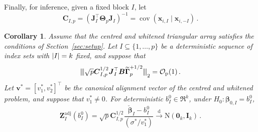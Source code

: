 \documentclass{article}
\makeatletter
\DeclareMathOperator{\cov}{cov}
\newtheorem{corollary}[theorem]{Corollary}
\theoremstyle{definition}
\newcommand{\abs}[1]{%
	\ensuremath{%
		\if@display
		\left| #1 \right|
		\else
		\lvert #1 \rvert
		\fi
	}%
}
\newcommand{\mnorms}[1]{{\vert\kern-0.25ex\vert\kern-0.25ex\vert #1
		\vert\kern-0.25ex\vert\kern-0.25ex\vert}}
\newcommand*{\bb}{\boldsymbol}
\def\bx{\bb{x}}
\def\bv{\bb{v}}
\def\bTheta{\bb{\Theta}}
\def\bbeta{\bb{\beta}}
\makeatother
\begin{document}
\begin{bibunit}
Finally, for inference, given a fixed block $I$, let
$$
\bb C_{I,p}
=
\left(
\bb J_I^\top\bTheta_p\bb J_I
\right)^{-1}
=
\cov(\bx_{i,I}\mid\bx_{i,-I})\,.
$$
\begin{corollary}

\label{cor:gaussian-covariance-adjusted-z}
Assume that the centred and whitened triangular array satisfies the
conditions of Section~\ref{sec:setup}. Let
$I\subseteq\{1,\ldots,p\}$ be a deterministic sequence of index sets
with $\abs{I}=k$ fixed, and suppose that
\begin{equation}
\label{eq:covariance-adjusted-z-leverage}
    \mnorms{
        \sqrt p
        \bb C_{I,p}^{1/2}
        \bb J_I^\top
        \bb B
        \widetilde{\bb\Gamma}_p^{+1/2}
    }_2
    =
    \mathcal O_{\mathrm p}(1) \,.
\end{equation}
Let
$\bv^*=[v_1^*,v_2^*]^\top$
be the canonical alignment vector of the centred and whitened problem, and
suppose that $v_1^*\neq0$. For deterministic
$b_I^0\in\Re^k$, under
$
    H_0:
    \bbeta_{0,I}=b_I^0
$,
\begin{equation}
\label{eq:covariance-adjusted-z-limit}
    \bb Z_I^{\mathrm{adj}}(b_I^0)
    =
    \sqrt p  \bb C_{I,p}^{1/2} \frac{\check{\bbeta}_I-b_I^0}{(\sigma^* / v_1^*)}
    \overset{\mathrm d}{\longrightarrow}
    \mathrm N(\bb0_k,\bb I_k)\,.
\end{equation}


\end{corollary}
\end{bibunit}
\end{document}
